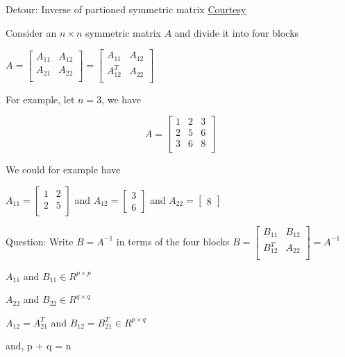 \documentclass{beamer}
\begin{document}
\begin{frame}{Detour: Inverse of partioned symmetric matrix}
\href{http://fourier.eng.hmc.edu/e161/lectures/gaussianprocess/node6.html}{Courtesy}

Consider an $n\times n$ symmetric matrix $A$ and divide it into four blocks

$
A = \begin{bmatrix}
	A_{11} & A_{12}\\
	A_{21} & A_{22} \\
\end{bmatrix} =  \begin{bmatrix}
A_{11} & A_{12}\\
A_{12}^T & A_{22} \\
\end{bmatrix}
$

For example, let $n=3$, we have

$$
A =  \begin{bmatrix}
	1 & 2 & 3\\
	2 & 5 & 6 \\
	3 & 6 & 8 \\
	
\end{bmatrix}
$$

We could for example have 

$A_{11} = \begin{bmatrix}
1 & 2 \\
2 & 5 \\
\end{bmatrix}$ and $A_{12} = \begin{bmatrix}
3 \\ 6
\end{bmatrix}
$ and $A_{22} = \begin{bmatrix}
8
\end{bmatrix}$


\end{frame}

\begin{frame}
Question: Write $B = A^{-1}$ in terms of the four blocks
$
B = \begin{bmatrix}
	B_{11} & B_{12}\\
	B_{12}^T & A_{22} \\
\end{bmatrix}
= A^{-1}$

$A_{11}$ and $B_{11} \in R^{p\times p}$ 

$A_{22}$ and $B_{22} \in R^{q\times q}$

$A_{12} = A_{21}^T$ and $B_{12} = B_{21}^T \in R^{p\times q}$

and, p + q = n 
 
\end{frame}
\end{document}
